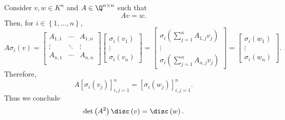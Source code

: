 \documentclass[pmath441]{subfiles}
\begin{document}
    \np Consider $v,w\in K^n$ and $A\in\Q^{n\times n}$ such that
    \begin{equation*}
        Av = w.
    \end{equation*}
    Then, for $i\in\left\lbrace 1,\ldots,n \right\rbrace$,
    \begin{equation*}
        A\sigma_i\left( v \right) =
        \begin{bmatrix}
            A_{1,1} & \cdots & A_{1,n} \\
        	\vdots & \ddots & \vdots \\
                A_{n,1} & \cdots & A_{n,n} \\
        \end{bmatrix}
        \begin{bmatrix} \sigma_i\left( v_1 \right) \\ \vdots \\ \sigma_i\left( v_n \right) \end{bmatrix} =
        \begin{bmatrix} \sigma_i\left( \sum^{n}_{j=1} A_{1,j}v_j \right) \\ \vdots \\ \sigma_i\left( \sum^{n}_{j=1} A_{n,j}v_j \right) \end{bmatrix} =
        \begin{bmatrix} \sigma_i\left( w_1 \right) \\ \vdots \\ \sigma_i\left( w_n \right) \end{bmatrix}.
    \end{equation*}
    Therefore,
    \begin{equation*}
        A \left[ \sigma_i\left( v_j \right) \right]^n_{i,j=1} = \left[ \sigma_i\left( w_j \right) \right]^n_{i,j=1}.
    \end{equation*}
    Thus we conclude
    \begin{equation*}
        \det\left( A^{2} \right)\disc\left( v \right) = \disc\left( w \right).
    \end{equation*}
    
\end{document}
